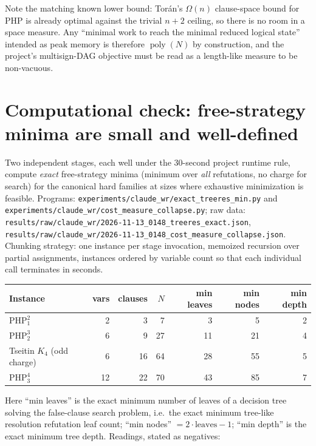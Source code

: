 \documentclass[11pt]{article}
\theoremstyle{definition}
\newcommand{\poly}{\operatorname{poly}}
\begin{document}
Note the matching known lower bound: Tor\'an's $\Omega(n)$ clause-space bound
for $\mathrm{PHP}$ \cite{toran99} is already optimal against the trivial $n+2$
ceiling, so there is no room in a space measure. Any ``minimal work to reach
the minimal reduced logical state'' intended as peak memory is therefore
$\poly(N)$ by construction, and the project's multisign-DAG objective must be
read as a length-like measure to be non-vacuous.

\section{Computational check: free-strategy minima are small and well-defined}
\label{sec:comp}

Two independent stages, each well under the 30-second project runtime rule,
compute \emph{exact} free-strategy minima (minimum over \emph{all} refutations,
no charge for search) for the canonical hard families at sizes where
exhaustive minimization is feasible. Programs:
\texttt{experiments/claude\_wr/exact\_treeres\_min.py} and
\texttt{experiments/claude\_wr/cost\_measure\_collapse.py}; raw data:
\texttt{results/raw/claude\_wr/2026-11-13\_0148\_treeres\_exact.json},
\texttt{results/raw/claude\_wr/2026-11-13\_0148\_cost\_measure\_collapse.json}.
Chunking strategy: one instance per stage invocation, memoized recursion over
partial assignments, instances ordered by variable count so that each
individual call terminates in seconds.

\begin{center}
\begin{tabular}{@{}lrrrrrr@{}}
\toprule
Instance & vars & clauses & $N$ & min leaves & min nodes & min depth\\
\midrule
$\mathrm{PHP}^{2}_{1}$ & 2 & 3 & 7 & 3 & 5 & 2\\
$\mathrm{PHP}^{3}_{2}$ & 6 & 9 & 27 & 11 & 21 & 4\\
Tseitin $K_4$ (odd charge) & 6 & 16 & 64 & 28 & 55 & 5\\
$\mathrm{PHP}^{4}_{3}$ & 12 & 22 & 70 & 43 & 85 & 7\\
\bottomrule
\end{tabular}
\end{center}

Here ``min leaves'' is the exact minimum number of leaves of a decision tree
solving the false-clause search problem, i.e.\ the exact minimum tree-like
resolution refutation leaf count; ``min nodes'' $=2\cdot\text{leaves}-1$;
``min depth'' is the exact minimum tree depth. Readings, stated as negatives:
\end{document}
